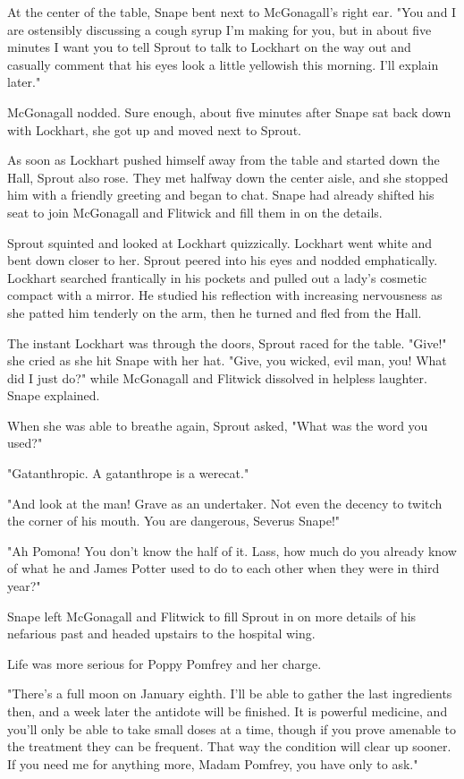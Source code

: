 At the center of the table, Snape bent next to McGonagall's right ear. "You and I are ostensibly discussing a cough syrup I'm making for you, but in about five minutes I want you to tell Sprout to talk to Lockhart on the way out and casually comment that his eyes look a little yellowish this morning. I'll explain later."

McGonagall nodded. Sure enough, about five minutes after Snape sat back down with Lockhart, she got up and moved next to Sprout.

As soon as Lockhart pushed himself away from the table and started down the Hall, Sprout also rose. They met halfway down the center aisle, and she stopped him with a friendly greeting and began to chat. Snape had already shifted his seat to join McGonagall and Flitwick and fill them in on the details.

Sprout squinted and looked at Lockhart quizzically. Lockhart went white and bent down closer to her. Sprout peered into his eyes and nodded emphatically. Lockhart searched frantically in his pockets and pulled out a lady's cosmetic compact with a mirror. He studied his reflection with increasing nervousness as she patted him tenderly on the arm, then he turned and fled from the Hall.

The instant Lockhart was through the doors, Sprout raced for the table. "Give!" she cried as she hit Snape with her hat. "Give, you wicked, evil man, you! What did I just do?" while McGonagall and Flitwick dissolved in helpless laughter. Snape explained.

When she was able to breathe again, Sprout asked, "What was the word you used?"

"Gatanthropic. A gatanthrope is a werecat."

"And look at the man! Grave as an undertaker. Not even the decency to twitch the corner of his mouth. You are dangerous, Severus Snape!"

"Ah Pomona! You don't know the half of it. Lass, how much do you already know of what he and James Potter used to do to each other when they were in third year{\el}?"

Snape left McGonagall and Flitwick to fill Sprout in on more details of his nefarious past and headed upstairs to the hospital wing.

Life was more serious for Poppy Pomfrey and her charge.

"There's a full moon on January eighth. I'll be able to gather the last ingredients then, and a week later the antidote will be finished. It is powerful medicine, and you'll only be able to take small doses at a time, though if you prove amenable to the treatment they can be frequent. That way the condition will clear up sooner. If you need me for anything more, Madam Pomfrey, you have only to ask."

